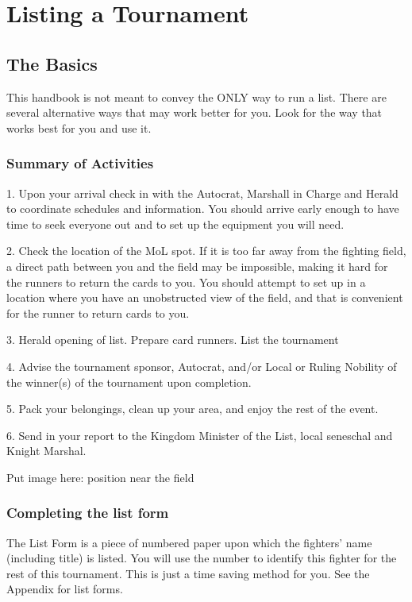 \documentclass{article}
\begin{document}
\section{Listing a Tournament}
\subsection{The Basics}
This handbook is not meant to convey the ONLY way to run a list. There are several alternative ways that
may work better for you. Look for the way that works best for you and use it.
\subsubsection{Summary of Activities}

1. Upon your arrival check in with the Autocrat, Marshall in Charge and Herald to coordinate
schedules and information. You should arrive early enough to have time to seek everyone out and to
set up the equipment you will need.

2. Check the location of the MoL spot. If it is too far away from the fighting field, a direct path
between you and the field may be impossible, making it hard for the runners to return the cards to
you. You should attempt to set up in a location where you have an unobstructed view of the field,
and that is convenient for the runner to return cards to you.

3. Herald opening of list. Prepare card runners. List the tournament

4. Advise the tournament sponsor, Autocrat, and/or Local or Ruling Nobility of the winner(s) of the
tournament upon completion.

5. Pack your belongings, clean up your area, and enjoy the rest of the event.

6. Send in your report to the Kingdom Minister of the List, local seneschal and Knight Marshal.



Put image here: position near the field



\subsubsection{Completing the list form}

The List Form is a piece of numbered paper upon which the fighters’ name (including title) is listed. You
will use the number to identify this fighter for the rest of this tournament. This is just a time saving
method for you. See the Appendix for list forms.
\end{document}
